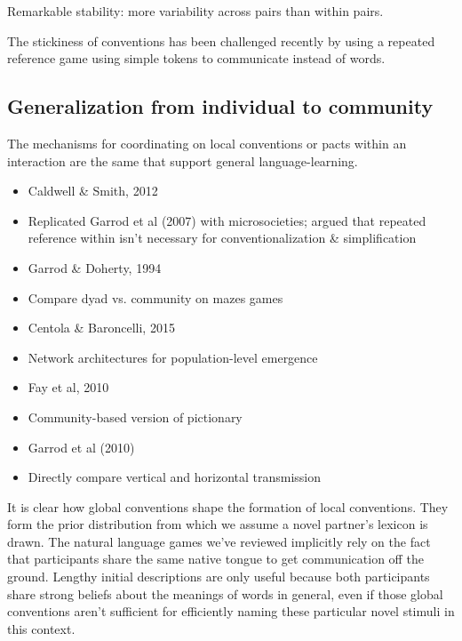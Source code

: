 \documentclass[11pt, floatsintext, jou]{apa6}
\begin{document}
Remarkable stability: more variability across pairs than within pairs. 


The stickiness of conventions has been challenged recently by  using a repeated reference game using simple tokens to communicate instead of words.

%
%

\subsection{Generalization from individual to community}

The mechanisms for coordinating on local conventions or pacts within an interaction are the same that support general language-learning. 

\begin{itemize}
\item Caldwell \& Smith, 2012
\item Replicated Garrod et al (2007) with microsocieties; argued that repeated reference within isn't necessary for conventionalization \& simplification
\item Garrod \& Doherty, 1994
\item Compare dyad vs. community on mazes games
\item Centola \& Baroncelli, 2015
\item Network architectures for population-level emergence
\item Fay et al, 2010 
\item Community-based version of pictionary
\item Garrod et al (2010)
\item Directly compare vertical and horizontal transmission
\end{itemize}

It is clear how global conventions shape the formation of local conventions. They form the prior distribution from which we assume a novel partner's lexicon is drawn. The natural language games we've reviewed %
implicitly rely on the fact that participants share the same native tongue to get communication off the ground. Lengthy initial descriptions are only useful because both participants share strong beliefs about the meanings of words in general, even if those global conventions aren't sufficient for efficiently naming these particular novel stimuli in this context. 
\end{document}
